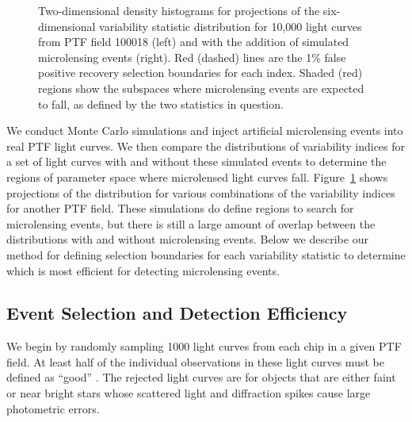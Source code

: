\documentclass{emulateapj}
\begin{document}
\begin{figure}[h]
\centering
	
	
	\caption{Two-dimensional density histograms for projections of the six-dimensional variability statistic distribution for 10,000 light curves from PTF field 100018 (left) and with the addition of simulated microlensing events (right). Red (dashed) lines are the 1\% false positive recovery selection boundaries for each index. Shaded (red) regions show the subspaces where microlensing events are expected to fall, as defined by the two statistics in question. } 
	\label{fig:var_indices}
\end{figure}

We conduct Monte Carlo simulations and inject artificial microlensing events into real PTF light curves. We then compare the distributions of variability indices for a set of light curves with and without these simulated events to determine the regions of parameter space where microlensed light curves fall. Figure~\ref{fig:var_indices} shows projections of the distribution for various combinations of the variability indices for another PTF field. These simulations do define regions to search for microlensing events, but there is still a large amount of overlap between the distributions with and without microlensing events. Below we describe our method for defining selection boundaries for each variability statistic to determine which is most efficient for detecting microlensing events.

\subsection{Event Selection and Detection Efficiency} \label{sec:detection_eff}
We begin by randomly sampling 1000 light curves from each chip in a given PTF field. At least half of the individual observations in these light curves must be defined as ``good'' \citep[see description of processing pipeline in][]{nick2009}. The rejected light curves are for objects that are either faint or near bright stars whose scattered light and diffraction spikes cause large photometric errors. 
\end{document}
